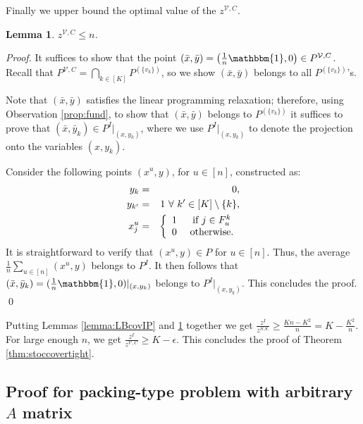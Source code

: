 \documentclass[smallextended]{svjour3}
\newtheorem{lemma}[proposition]{Lemma}
\begin{document}
	Finally we upper bound the optimal value of the $z^{{\mathcal{V}}, C}$.

	\begin{lemma} \label{lemma:UBcovSS}
		$z^{{\mathcal{V}}, C} \le n$.
	\end{lemma}
	
	\begin{proof}
		It suffices to show that the point $(\bar{x},\bar{y}) = \left(\frac{1}{n} {\mathbbm{1}}, 0\right)\in P^{{\mathcal{V}}, C}$. Recall that $P^{{\mathcal{V}}, C} = \bigcap_{k \in [K]} P^{(\{v_k\})}$, so we show $(\bar{x},\bar{y})$ belongs to all $P^{(\{v_k\})}$'s.
		
		Note that $(\bar{x},\bar{y})$ satisfies the linear programming relaxation; therefore, using Observation \ref{prop:fund}, to show that $(\bar{x}, \bar{y})$ belongs to $P^{(\{v_k\})}$ it suffices to prove that $(\bar{x}, \bar{y}_k) \in P^I|_{(x,y_k)}$, where we use $P^I|_{(x,y_k)}$ to denote the projection onto the variables $(x,y_k)$.
		
		Consider the following points $(x^u, y)$, for $u \in [n]$, constructed as:
\begin{eqnarray*}
y_k &=& 0, \\
y_{k'} &=& 1 \ \forall \ k' \in [K] \setminus \{k\},\\
x^u_j &=& \left \{ \begin{array}{cc} 1 & \textup{ if } j  \in F^k_u\\ 
0 & \textup{ otherwise.}
\end{array} 
\right. 
\end{eqnarray*}
It is straightforward to verify that $(x^u, y) \in P$ for $u \in [n]$. Thus, the average $ \frac{1}{n} \sum_{u \in [n]} (x^u, y) $ belongs to $P^I$. It then follows that $(\bar{x}, \bar{y}_k) = (\frac{1}{n} {\mathbbm{1}}, 0)|_{(x,y_k)}$ belongs to $P^I|_{(x,y_k)}$. This concludes the proof.{
\ifmp
	\hfill \qed
\fi
}
	\end{proof}
 
 Putting Lemmas \ref{lemma:LBcovIP} and \ref{lemma:UBcovSS} together we get $\frac{z^I}{z^{S.S.}} \ge \frac{Kn - K^2}{n} = K - \frac{K^2}{n}$. For large enough $n$, we get $\frac{z^I}{z^{{\mathcal{V}}, C}} 
 \ge K - \epsilon$. This concludes the proof of Theorem \ref{thm:stoccovertight}.

\subsection{Proof for packing-type problem with arbitrary $A$ matrix} \label{sec:proofpackinggen}
\end{document}
